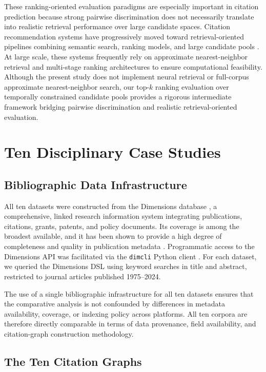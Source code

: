 \documentclass[11pt,a4paper]{article}
\begin{document}
These ranking-oriented evaluation paradigms are especially important in citation prediction because strong pairwise discrimination does not necessarily translate into realistic retrieval performance over large candidate spaces. Citation recommendation systems have progressively moved toward retrieval-oriented pipelines combining semantic search, ranking models, and large candidate pools \citep{bhagavatula2018content}. At large scale, these systems frequently rely on approximate nearest-neighbor retrieval and multi-stage ranking architectures to ensure computational feasibility. Although the present study does not implement neural retrieval or full-corpus approximate nearest-neighbor search, our top-\(k\) ranking evaluation over temporally constrained candidate pools provides a rigorous intermediate framework bridging pairwise discrimination and realistic retrieval-oriented evaluation.

\section{Ten Disciplinary Case Studies}
\label{sec:data}

\subsection{Bibliographic Data Infrastructure}

All ten datasets were constructed from the Dimensions database \citep{hook2018dimensions}, a comprehensive, linked research information system integrating publications, citations, grants, patents, and policy documents. Its coverage is among the broadest available, and it has been shown to provide a high degree of completeness and quality in publication metadata \citep{delgado2024completeness, nguyen2022quality}. Programmatic access to the Dimensions API was facilitated via the \texttt{dimcli} Python client \citep{dimcli2021}. For each dataset, we queried the Dimensions DSL using keyword searches in title and abstract, restricted to journal articles published 1975--2024.

The use of a single bibliographic infrastructure for all ten datasets ensures that the comparative analysis is not confounded by differences in metadata availability, coverage, or indexing policy across platforms. All ten corpora are therefore directly comparable in terms of data provenance, field availability, and citation-graph construction methodology.

\subsection{The Ten Citation Graphs}
\end{document}
